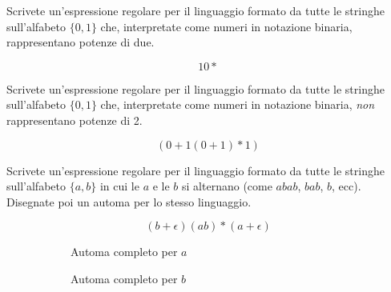 \documentclass[12pt, answers]{exam}
\begin{document}
\begin{questions}
	\question Scrivete un'espressione regolare per il linguaggio formato da tutte le stringhe sull'alfabeto $\{0, 1\}$ che, interpretate come numeri in notazione binaria, rappresentano potenze di due.
	\begin{solution}
		$$ 1 0* $$
	\end{solution}
	\question Scrivete un'espressione regolare per il linguaggio formato da tutte le stringhe sull'alfabeto $\{0, 1\}$ che, interpretate come numeri in notazione binaria, \textit{non} rappresentano potenze di 2.
	\begin{solution}
		$$ (0 + 1 (0 + 1)* 1) $$
	\end{solution}
	\question Scrivete un'espressione regolare per il linguaggio formato da tutte le stringhe sull'alfabeto $\{a, b\}$ in cui le $a$ e le $b$ si alternano (come $abab$, $bab$, $b$, ecc).
	Disegnate poi un automa per lo stesso linguaggio.
	\begin{solution}
		$$ (b + \epsilon)(ab)* (a + \epsilon) $$
		\begin{figure}[H]
			\centering
			\begin{subfigure}{0.4\textwidth}
				\centering
				\caption{Automa completo per $a$}
			\end{subfigure}
			\begin{subfigure}{0.4\textwidth}
				\centering
				\caption{Automa completo per $b$}
			\end{subfigure}
			\begin{subfigure}{\textwidth}
				\centering
\end{subfigure}
\end{figure}
\end{solution}
\end{questions}
\end{document}
